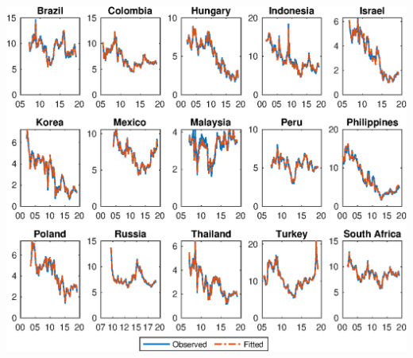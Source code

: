 \documentclass[12pt, aspectratio=169, xcolor=dvipsnames]{beamer}  %
\begin{document}
\begin{frame}[label=ModelFit]
	\begin{center}							%
		\includegraphics[trim={0cm 0cm 0cm 0cm},clip,height=0.86\textheight,width=\linewidth]{../Figures/Estimation/s_ylds_bsl_yQ.eps} \\
	\end{center}
\end{frame}
\end{document}
